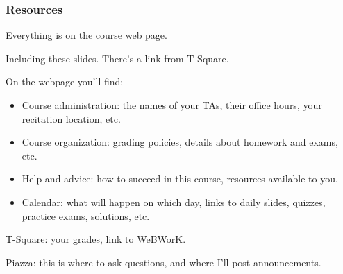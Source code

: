 \begin{frame}
\frametitle{Resources}

\begin{bluebox}{.8\textwidth}
  \LARGE\centering Everything is on the course web page.
\end{bluebox}

\pause\smallskip
Including these slides.
\pause
There's a link from T-Square.

\pause\medskip
On the webpage you'll find:
\pause
\begin{itemize}
\item\alert{Course administration:} the names of your TAs, their office hours,
  your recitation location, etc.
\pause
\item\alert{Course organization:} grading policies, details about homework and
  exams, etc.
\pause
\item\alert{Help and advice:} how to succeed in this course, resources available
  to you.
\pause
\item\alert{Calendar:} what will happen on which day, links to daily slides,
  quizzes, practice exams, solutions, etc.
\end{itemize}

\pause\medskip
\alert{T-Square:} your grades, link to WeBWorK.

\pause\medskip
\alert{Piazza:} this is where to ask questions, and where I'll post announcements.

\end{frame}



